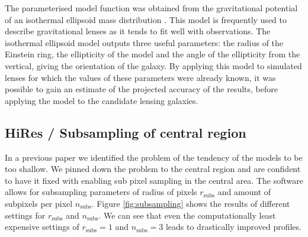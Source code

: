 \documentclass[fleqn,usenatbib]{mnras}
\newcommand{\Figref}[1]{Figure \ref{fig:#1}}
\begin{document}
The parameterised model function was obtained from the gravitational potential of an isothermal ellipsoid mass distribution \cite{2001astro.ph..2340K}.
This model is frequently used to describe gravitational lenses as it tends to fit well with observations.
The isothermal ellipsoid model outputs three useful parameters: the radius of the Einstein ring, the ellipticity of the model and the angle of the ellipticity from the vertical, giving the orientation of the galaxy.
By applying this model to simulated lenses for which the values of these parameters were already known, it was possible to gain an estimate of the projected accuracy of the results, before applying the model to the candidate lensing galaxies.


\subsection{HiRes / Subsampling of central region}
In a previous paper \cite{2015MNRAS.447.2170K} we identified the problem of the tendency of the models to be too shallow.
We pinned down the problem to the central region and are confident to have it fixed with enabling sub pixel sampling in the central area.
The software allows for subsampling parameters of radius of pixels $r_\text{subs}$ and amount of subpixels per pixel $n_\text{subs}$.
\Figref{subsampling} shows the results of different settings for $r_\text{subs}$ and $n_\text{subs}$.
We can see that even the computationally least expensive settings of $r_\text{subs}=1$ and $n_\text{subs}=3$ leads to drastically improved profiles.
\end{document}
